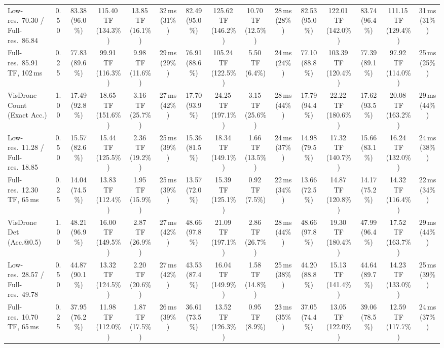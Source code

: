 \begin{table}[t]
{\begin{tabular}{l c | c c c c | c c c c | c c | c c c}
{\footnotesize Low-res.\ 70.30 / Full-res.\ 86.84} & 0.50 & 83.38 (96.0\%) & 115.40\,TF (134.3\%) & 13.85\,TF (16.1\%) & 32\,ms (31\%) & 82.49 (95.0\%) & 125.62\,TF (146.2\%) & 10.70\,TF (12.5\%) & 28\,ms (28\%) & 82.53 (95.0\%) & 122.01\,TF (142.0\%) & 83.74 (96.4\%) & 111.15\,TF (129.4\%) & 31\,ms (31\%) \\
{\footnotesize Full-res.\ 85.91\,TF, 102\,ms} & 0.25 & 77.83 (89.6\%) & 99.91\,TF (116.3\%) & 9.98\,TF (11.6\%) & 29\,ms (29\%) & 76.91 (88.6\%) & 105.24\,TF (122.5\%) & 5.50\,TF (6.4\%) & 24\,ms (24\%) & 77.10 (88.8\%) & 103.39\,TF (120.4\%) & 77.39 (89.1\%) & 97.92\,TF (114.0\%) & 25\,ms (25\%) \\
\cmidrule(lr){1-15}
VisDrone Count (Exact Acc.) & 1.00 & 17.49 (92.8\%) & 18.65\,TF (151.6\%) & 3.16\,TF (25.7\%) & 27\,ms (42\%) & 17.70 (93.9\%) & 24.25\,TF (197.1\%) & 3.15\,TF (25.6\%) & 28\,ms (44\%) & 17.79 (94.4\%) & 22.22\,TF (180.6\%) & 17.62 (93.5\%) & 20.08\,TF (163.2\%) & 29\,ms (44\%) \\
{\footnotesize Low-res.\ 11.28 / Full-res.\ 18.85} & 0.50 & 15.57 (82.6\%) & 15.44\,TF (125.5\%) & 2.36\,TF (19.2\%) & 25\,ms (39\%) & 15.36 (81.5\%) & 18.34\,TF (149.1\%) & 1.66\,TF (13.5\%) & 24\,ms (37\%) & 14.98 (79.5\%) & 17.32\,TF (140.7\%) & 15.66 (83.1\%) & 16.24\,TF (132.0\%) & 24\,ms (38\%) \\
{\footnotesize Full-res.\ 12.30\,TF, 65\,ms} & 0.25 & 14.04 (74.5\%) & 13.83\,TF (112.4\%) & 1.95\,TF (15.9\%) & 25\,ms (39\%) & 13.57 (72.0\%) & 15.39\,TF (125.1\%) & 0.92\,TF (7.5\%) & 22\,ms (34\%) & 13.66 (72.5\%) & 14.87\,TF (120.8\%) & 14.17 (75.2\%) & 14.32\,TF (116.4\%) & 22\,ms (34\%) \\
\cmidrule(lr){1-15}
VisDrone Det (Acc.@0.5) & 1.00 & 48.21 (96.9\%) & 16.00\,TF (149.5\%) & 2.87\,TF (26.9\%) & 27\,ms (42\%) & 48.66 (97.8\%) & 21.09\,TF (197.1\%) & 2.86\,TF (26.7\%) & 28\,ms (44\%) & 48.66 (97.8\%) & 19.30\,TF (180.4\%) & 47.99 (96.4\%) & 17.52\,TF (163.7\%) & 29\,ms (44\%) \\
{\footnotesize Low-res.\ 28.57 / Full-res.\ 49.78} & 0.50 & 44.87 (90.1\%) & 13.32\,TF (124.5\%) & 2.20\,TF (20.6\%) & 27\,ms (42\%) & 43.53 (87.4\%) & 16.04\,TF (149.9\%) & 1.58\,TF (14.8\%) & 25\,ms (38\%) & 44.20 (88.8\%) & 15.13\,TF (141.4\%) & 44.64 (89.7\%) & 14.23\,TF (133.0\%) & 25\,ms (39\%) \\
{\footnotesize Full-res.\ 10.70\,TF, 65\,ms} & 0.25 & 37.95 (76.2\%) & 11.98\,TF (112.0\%) & 1.87\,TF (17.5\%) & 26\,ms (39\%) & 36.61 (73.5\%) & 13.52\,TF (126.3\%) & 0.95\,TF (8.9\%) & 23\,ms (35\%) & 37.05 (74.4\%) & 13.05\,TF (122.0\%) & 39.06 (78.5\%) & 12.59\,TF (117.7\%) & 24\,ms (37\%) \\

\end{tabular}}
\end{table}
